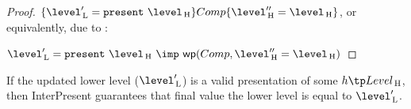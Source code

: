 \begin{proof} 
$\assert{ \level'\L = \present~\level\H } {Comp} \assert{ \level''\H = \level\H }$, or equivalently, due to :

$\level'\L = \present~\level\H ~\imp~ \wp{Comp}{ \level''\H = \level\H}$



%
%
%
\end{proof}


If the updated lower level ($\level'\L$) is a valid presentation of some $h \tp Level\H$, then {\sc InterPresent} guarantees that final value the lower level is equal to $\level'\L$.



